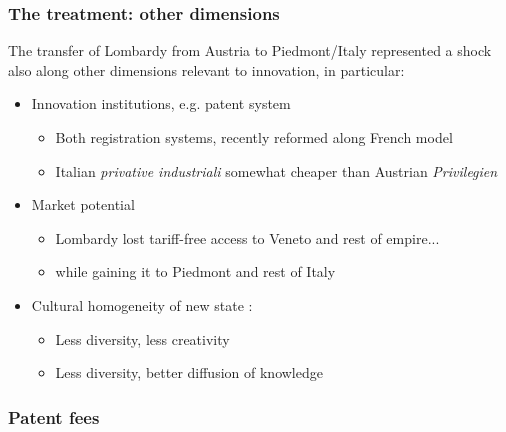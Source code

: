 \documentclass[10pt]{beamer}
\begin{document}
\begin{frame}
    \frametitle{The treatment: other dimensions}
    
    The transfer of Lombardy from Austria to Piedmont/Italy represented a shock also along other dimensions relevant to innovation, in particular:

    \begin{itemize}
        \item Innovation institutions, e.g. patent system

        \begin{itemize}
            \item Both registration systems, recently reformed along French model
            \item Italian \textit{privative industriali} somewhat cheaper than Austrian \textit{Privilegien}  
        \end{itemize}

        \item Market potential \citep{missiaia2016}

        \begin{itemize}
            \item Lombardy lost tariff-free access to Veneto and rest of empire...
            \item while gaining it to Piedmont and rest of Italy
        \end{itemize}

        \item Cultural homogeneity of new state \citep{ertug2022, mokyr2024}:

        \begin{itemize}
            \item Less diversity, less creativity 
            \item Less diversity, better diffusion of knowledge
        \end{itemize}

    \end{itemize}
    
\end{frame}

\begin{frame}[label = patent_fees]
    \frametitle{Patent fees}


\hyperlink{duration}{}  

\end{frame}
\end{document}
